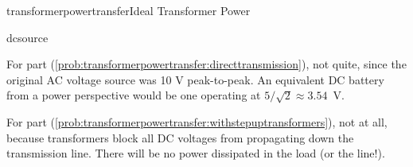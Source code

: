\begin{mainquestion}{transformerpowertransfer}{Ideal Transformer Power}
\begin{partquestion}{dcsource}
\begin{answer}
For part (\cref{prob:transformerpowertransfer:directtransmission}), not quite, since the original AC voltage source was 10 V peak-to-peak. An equivalent DC battery from a power perspective would be one operating at $5/\sqrt{2} \approx 3.54$~V.

For part (\cref{prob:transformerpowertransfer:withstepuptransformers}), not at all, because transformers block all DC voltages from propagating down the transmission line. There will be no power dissipated in the load (or the line!).
\end{answer}
\end{partquestion}

\end{mainquestion}
